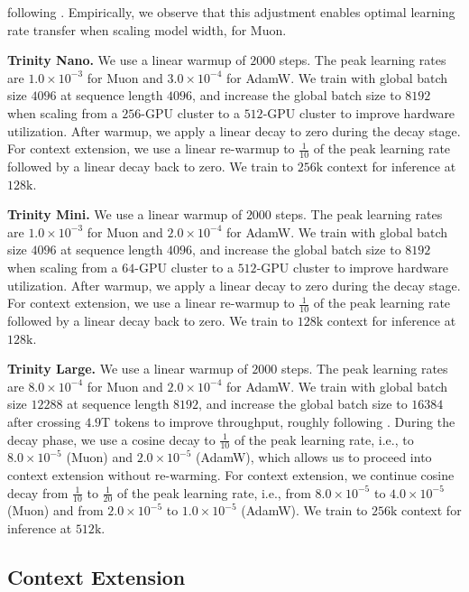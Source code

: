 \documentclass{article}
\begin{document}
following \cite{jordan2024muon_repo}. Empirically, we observe that this adjustment enables optimal learning rate transfer when scaling model width, for Muon. 

\textbf{Trinity Nano.}
We use a linear warmup of $2000$ steps.
The peak learning rates are $1.0\times 10^{-3}$ for Muon and $3.0\times 10^{-4}$ for AdamW.
We train with global batch size $4096$ at sequence length $4096$, and increase the global batch size to $8192$ when scaling from a $256$-GPU cluster to a $512$-GPU cluster to improve hardware utilization.
After warmup, we apply a linear decay to zero during the decay stage.
For context extension, we use a linear re-warmup to $\tfrac{1}{10}$ of the peak learning rate followed by a linear decay back to zero.
We train to $256\text{k}$ context for inference at $128\text{k}$.

\textbf{Trinity Mini.}
We use a linear warmup of $2000$ steps.
The peak learning rates are $1.0\times 10^{-3}$ for Muon and $2.0\times 10^{-4}$ for AdamW.
We train with global batch size $4096$ at sequence length $4096$, and increase the global batch size to $8192$ when scaling from a $64$-GPU cluster to a $512$-GPU cluster to improve hardware utilization.
After warmup, we apply a linear decay to zero during the decay stage.
For context extension, we use a linear re-warmup to $\tfrac{1}{10}$ of the peak learning rate followed by a linear decay back to zero.
We train to $128\text{k}$ context for inference at $128\text{k}$.

\textbf{Trinity Large.}
We use a linear warmup of $2000$ steps.
The peak learning rates are $8.0\times 10^{-4}$ for Muon and $2.0\times 10^{-4}$ for AdamW.
We train with global batch size $12288$ at sequence length $8192$, and increase the global batch size to $16384$ after crossing $4.9$T tokens to improve throughput, roughly following \cite{minimax2025minimax01scalingfoundationmodels}.
During the decay phase, we use a cosine decay to $\tfrac{1}{10}$ of the peak learning rate, i.e., to $8.0\times 10^{-5}$ (Muon) and $2.0\times 10^{-5}$ (AdamW), which allows us to proceed into context extension without re-warming.
For context extension, we continue cosine decay from $\tfrac{1}{10}$ to $\tfrac{1}{20}$ of the peak learning rate, i.e., from $8.0\times 10^{-5}$ to $4.0\times 10^{-5}$ (Muon) and from $2.0\times 10^{-5}$ to $1.0\times 10^{-5}$ (AdamW).
We train to $256\text{k}$ context for inference at $512\text{k}$.

\subsection{Context Extension}
\end{document}
